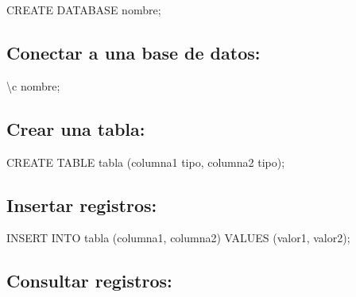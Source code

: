 \documentclass[
  a4paper,
  onepage,
  openany]{scrreprt}
\newenvironment{Shaded}{\begin{snugshade}}{\end{snugshade}}
\newcommand{\KeywordTok}[1]{\textcolor[rgb]{0.00,0.23,0.31}{#1}}
\newcommand{\NormalTok}[1]{\textcolor[rgb]{0.00,0.23,0.31}{#1}}
\begin{document}
\begin{Shaded}
\begin{Highlighting}[]
\KeywordTok{CREATE} \KeywordTok{DATABASE}\NormalTok{ nombre;}
\end{Highlighting}
\end{Shaded}

\hypertarget{conectar-a-una-base-de-datos-1}{%
\subsection{Conectar a una base de
datos:}\label{conectar-a-una-base-de-datos-1}}

\begin{Shaded}
\begin{Highlighting}[]
\NormalTok{\textbackslash{}c nombre;}
\end{Highlighting}
\end{Shaded}

\hypertarget{crear-una-tabla-1}{%
\subsection{Crear una tabla:}\label{crear-una-tabla-1}}

\begin{Shaded}
\begin{Highlighting}[]
\KeywordTok{CREATE} \KeywordTok{TABLE}\NormalTok{ tabla (columna1 tipo, columna2 tipo);}
\end{Highlighting}
\end{Shaded}

\hypertarget{insertar-registros-1}{%
\subsection{Insertar registros:}\label{insertar-registros-1}}

\begin{Shaded}
\begin{Highlighting}[]
\KeywordTok{INSERT} \KeywordTok{INTO}\NormalTok{ tabla (columna1, columna2) }\KeywordTok{VALUES}\NormalTok{ (valor1, valor2);}
\end{Highlighting}
\end{Shaded}

\hypertarget{consultar-registros-1}{%
\subsection{Consultar registros:}\label{consultar-registros-1}}
\end{document}
